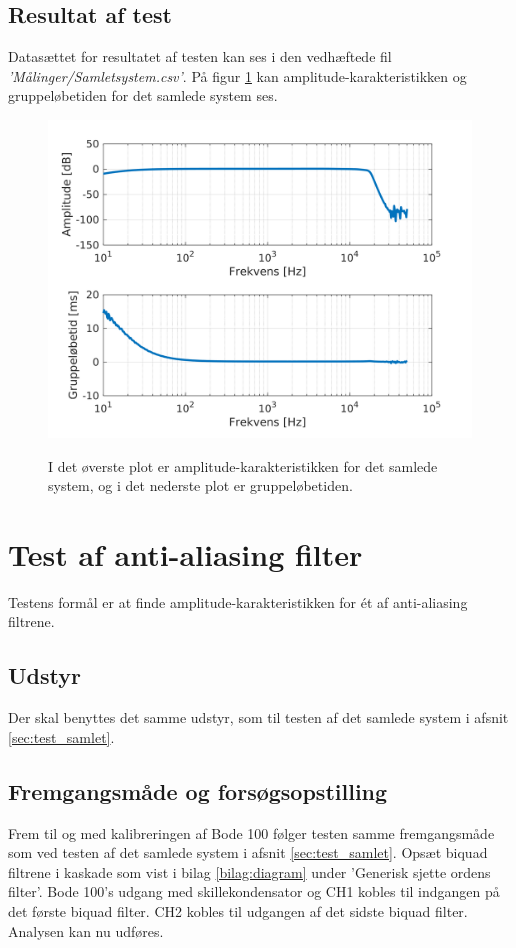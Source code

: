 \subsection{Resultat af test}
Datasættet for resultatet af testen kan ses i den vedhæftede fil \textit{'Målinger/Samlet\textunderscore system.csv'}. 
På figur \ref{fig:tf_tg_samletsystem} kan amplitude-karakteristikken og gruppeløbetiden for det samlede system ses.
\begin{figure}[h]
	\caption{I det øverste plot er amplitude-karakteristikken for det samlede system, og i det nederste plot er gruppeløbetiden.}
	\includegraphics[width=1\linewidth]{matlab/tf_tg_samletsystem.png}
	\label{fig:tf_tg_samletsystem}
\end{figure}

\section{Test af anti-aliasing filter}
\label{sec:test_aafilter}
Testens formål er at finde amplitude-karakteristikken for ét af anti-aliasing filtrene. 

\subsection{Udstyr}
Der skal benyttes det samme udstyr, som til testen af det samlede system i afsnit \ref{sec:test_samlet}.

\subsection{Fremgangsmåde og forsøgsopstilling}
Frem til og med kalibreringen af Bode 100 følger testen samme fremgangsmåde som ved testen af det samlede system i afsnit \ref{sec:test_samlet}. \newline
Opsæt biquad filtrene i kaskade som vist i bilag \ref{bilag:diagram} under 'Generisk sjette ordens filter'. 
Bode 100's udgang med skillekondensator og CH1 kobles til indgangen på det første biquad filter. 
CH2 kobles til udgangen af det sidste biquad filter. \newline
Analysen kan nu udføres. 

